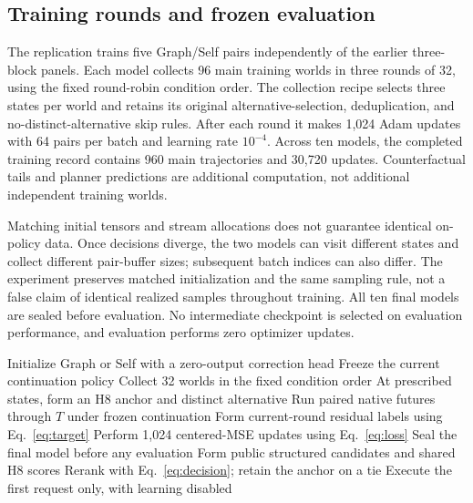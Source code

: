 \documentclass[preprint,12pt]{elsarticle}
\begin{document}
\subsection{Training rounds and frozen evaluation}
The replication trains five Graph/Self pairs independently of the earlier
three-block panels. Each model collects 96 main training worlds in three rounds
of 32, using the fixed round-robin condition order. The collection recipe selects
three states per world and retains its original alternative-selection,
deduplication, and no-distinct-alternative skip rules. After each round it makes
1,024 Adam updates with 64 pairs per batch and learning rate $10^{-4}$.
Across ten models, the completed training record contains 960 main trajectories
and 30,720 updates. Counterfactual tails and planner predictions are additional
computation, not additional independent training worlds.

Matching initial tensors and stream allocations does not guarantee identical
on-policy data. Once decisions diverge, the two models can visit different
states and collect different pair-buffer sizes; subsequent batch indices can
also differ. The experiment preserves matched initialization and the same
sampling rule, not a false claim of identical realized samples throughout
training. All ten final models are sealed before evaluation. No intermediate
checkpoint is selected on evaluation performance, and evaluation performs zero
optimizer updates.

\begin{algorithm}[t]
\caption{Planning-assisted paired cost-correction learning}
\label{alg:method}
\begin{algorithmic}[1]
\State Initialize Graph or Self with a zero-output correction head
  \State Freeze the current continuation policy
  \State Collect 32 worlds in the fixed condition order
  \State At prescribed states, form an H8 anchor and distinct alternative
  \State Run paired native futures through $T$ under frozen continuation
  \State Form current-round residual labels using Eq.~\eqref{eq:target}
  \State Perform 1,024 centered-MSE updates using Eq.~\eqref{eq:loss}
\EndFor
\State Seal the final model before any evaluation
  \State Form public structured candidates and shared H8 scores
  \State Rerank with Eq.~\eqref{eq:decision}; retain the anchor on a tie
  \State Execute the first request only, with learning disabled
\EndFor
\end{algorithmic}
\end{algorithm}
\end{document}
